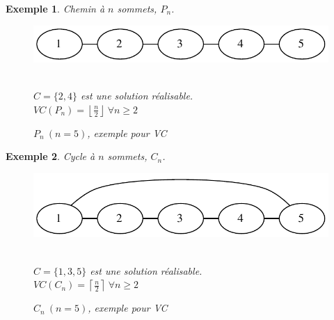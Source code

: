 \documentclass{article}
\newcommand{\ceil}[1]{\left\lceil #1 \right\rceil}
\newcommand{\cdil}[1]{\left\lfloor #1 \right\rfloor}
\newtheorem{exemple}{Exemple}[section]
\begin{document}
\begin{sffamily}
\begin{exemple}
Chemin à $n$ sommets, $P_n$.\\
\begin{figure}[h!]
    \begin{center}
    \includegraphics[scale=0.5]{pn.pdf}
    \caption{$P_n\ (n=5)$, exemple pour VC}
    $ $ \\
	$C = \{2,4\}$ est une solution réalisable. \\
	$VC(P_n)=\cdil{\frac{n}{2}}\ \forall n \geq 2$
    \end{center}
\end{figure}
\end{exemple}

\begin{exemple}
Cycle à $n$ sommets, $C_n$.\\
\begin{figure}[h!]
    \begin{center}
    \includegraphics[scale=0.5]{cn.pdf}
    \caption{$C_n\ (n=5)$, exemple pour VC}
    $ $ \\
	$C = \{1,3,5\}$ est une solution réalisable. \\
	$VC(C_n)=\ceil{\frac{n}{2}}\ \forall n \geq 2$
    \end{center}
\end{figure}
\end{exemple}

\newpage


\end{sffamily}
\end{document}
